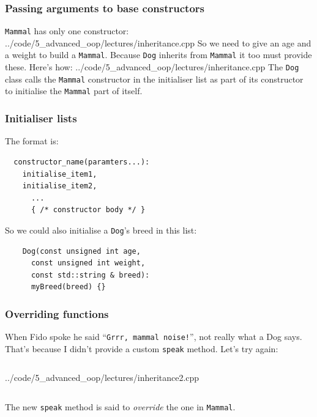 \documentclass{beamer}
\begin{document}
\begin{frame}[fragile]
  \frametitle{Passing arguments to base constructors}
  
  \texttt{Mammal} has only one constructor:
  	{../code/5_advanced_oop/lectures/inheritance.cpp}
  So we need to give an age and a weight to build a \texttt{Mammal}.  Because \texttt{Dog} inherits from \texttt{Mammal} it too must provide these.\pause{} Here's how:
  	{../code/5_advanced_oop/lectures/inheritance.cpp}  
	The \texttt{Dog} class calls the \texttt{Mammal} constructor in the initialiser list as part of its constructor to initialise the \texttt{Mammal} part of itself.

\end{frame}

\begin{frame}[fragile]
  \frametitle{Initialiser lists}
  
	
	The format is:
	\begin{lstlisting}
  constructor_name(paramters...):
    initialise_item1,
    initialise_item2,
	  ...
	  { /* constructor body */ }
	\end{lstlisting}
	So we could also initialise a \texttt{Dog}'s breed in this list:
	\begin{lstlisting}
	Dog(const unsigned int age,
	  const unsigned int weight,
	  const std::string & breed):
	  myBreed(breed) {}
	\end{lstlisting}
\end{frame}

\begin{frame}[fragile]
  \frametitle{Overriding functions}
  
  When Fido spoke he said ``\texttt{Grrr, mammal noise!}'', not really what a Dog says.  That's because I didn't provide a custom \texttt{speak} method.  Let's try again:\pause
  \begin{columns}[t]
    \begin{column}[T]{0.55\linewidth}
  			{../code/5_advanced_oop/lectures/inheritance2.cpp}  
  	\end{column}
  	\begin{column}[T]{0.4\linewidth}
  	\end{column}
  \end{columns}
  \pause
  The new \texttt{speak} method is said to \textit{override} the one in \texttt{Mammal}.

\end{frame}
\end{document}
